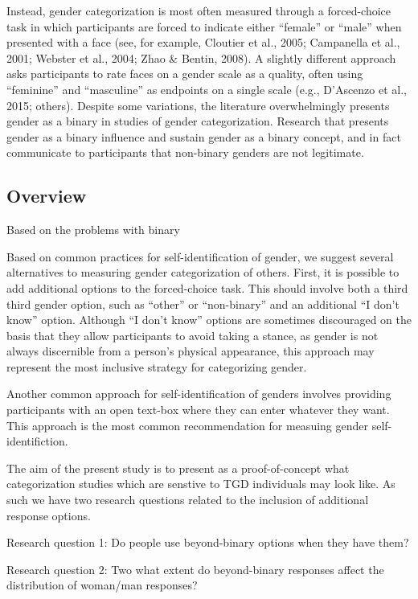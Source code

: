 \documentclass[
  man]{apa7}
\begin{document}
Instead, gender categorization is most often measured through a forced-choice task in which participants are forced to indicate either ``female'' or ``male'' when presented with a face (see, for example, Cloutier et al., 2005; Campanella et al., 2001; Webster et al., 2004; Zhao \& Bentin, 2008). A slightly different approach asks participants to rate faces on a gender scale as a quality, often using ``feminine'' and ``masculine'' as endpoints on a single scale (e.g., D'Ascenzo et al., 2015; others). Despite some variations, the literature overwhelmingly presents gender as a binary in studies of gender categorization. Research that presents gender as a binary influence and sustain gender as a binary concept, and in fact communicate to participants that non-binary genders are not legitimate.

\hypertarget{overview}{%
\subsection{Overview}\label{overview}}

Based on the problems with binary

Based on common practices for self-identification of gender, we suggest several alternatives to measuring gender categorization of others. First, it is possible to add additional options to the forced-choice task. This should involve both a third third gender option, such as ``other'' or ``non-binary'' and an additional ``I don't know'' option. Although ``I don't know'' options are sometimes discouraged on the basis that they allow participants to avoid taking a stance, as gender is not always discernible from a person's physical appearance, this approach may represent the most inclusive strategy for categorizing gender.

Another common approach for self-identification of genders involves providing participants with an open text-box where they can enter whatever they want. This approach is the most common recommendation for measuing gender self-identifiction.

The aim of the present study is to present as a proof-of-concept what categorization studies which are senstive to TGD individuals may look like. As such we have two research questions related to the inclusion of additional response options.

Research question 1: Do people use beyond-binary options when they have them?

Research question 2: Two what extent do beyond-binary responses affect the distribution of woman/man responses?
\end{document}
